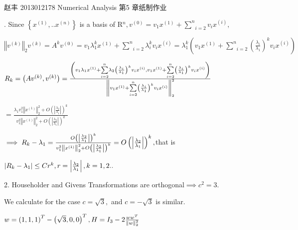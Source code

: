 \documentclass{article}
\begin{document}
\bigskip \bigskip 赵丰 2013012178 Numerical Analysis 第5 
章纸制作业

. Since $\left\{ x^{\left( 1\right) },..x^{\left( n\right)
}\right\} $ is a basis of R$^{n},v^{\left( 0\right) }=v_{1}x^{\left(
1\right) }+\underset{i=2}{\overset{n}{\sum }}v_{i}x^{\left( i\right) },$

$\left\Vert v^{\left( k\right) }\right\Vert _{2}v^{\left( k\right)
}=A^{k}v^{\left( 0\right) }=v_{1}\lambda _{1}^{k}x^{\left( 1\right) }+%
\underset{i=2}{\overset{n}{\sum }}\lambda _{i}^{k}v_{i}x^{\left( i\right)
}=\lambda _{1}^{k}\left( v_{1}x^{\left( 1\right) }+\underset{i=2}{\overset{n}%
{\sum }}\left( \frac{\lambda _{i}}{\lambda _{1}}\right) ^{k}v_{i}x^{\left(
i\right) }\right) $

$R_{k}=\left( Av^{\left( k\right) },v^{\left( k\right) }\right) =\frac{%
\left( v_{1}\lambda _{1}x^{\left( 1\right) }+\underset{i=2}{\overset{n}{\sum 
}}\lambda _{2}\left( \frac{\lambda _{i}}{\lambda _{1}}\right)
^{k}v_{i}x^{\left( i\right) },v_{1}x^{\left( 1\right) }+\underset{i=2}{%
\overset{n}{\sum }}\left( \frac{\lambda _{i}}{\lambda _{1}}\right)
^{k}v_{i}x^{\left( i\right) }\right) }{\left\Vert v_{1}x^{\left( 1\right) }+%
\underset{i=2}{\overset{n}{\sum }}\left( \frac{\lambda _{i}}{\lambda _{1}}%
\right) ^{k}v_{i}x^{\left( i\right) }\right\Vert _{2}^{2}}$

$=\frac{\lambda _{1}v_{1}^{2}\left\Vert x^{\left( 1\right) }\right\Vert
_{2}^{2}+O\left( \left\vert \frac{\lambda _{2}}{\lambda _{1}}\right\vert
\right) ^{k}}{v_{1}^{2}\left\Vert x^{\left( 1\right) }\right\Vert
_{2}^{2}+O\left( \left\vert \frac{\lambda _{2}}{\lambda _{1}}\right\vert
\right) ^{k}}$

$\implies R_{k}-\lambda _{1}=\frac{O\left( \left\vert \frac{\lambda _{2}}{%
\lambda _{1}}\right\vert \right) ^{k}}{v_{1}^{2}\left\Vert x^{\left(
1\right) }\right\Vert _{2}^{2}+O\left( \left\vert \frac{\lambda _{2}}{%
\lambda _{1}}\right\vert \right) ^{k}}=O\left( \left\vert \frac{\lambda _{2}%
}{\lambda _{1}}\right\vert \right) ^{k},$that is 

$\left\vert R_{k}-\lambda _{1}\right\vert \leq Cr^{k},r=\left\vert \frac{%
\lambda _{2}}{\lambda _{1}}\right\vert ,k=1,2..$

2. Householder and Givens Transformations are orthogonal$\implies c^{2}=3.$

We calculate for the case $c=\sqrt{3},$ and $c=-\sqrt{3}$ is similar.

$w=\left( 1,1,1\right) ^{T}-\left( \sqrt{3},0,0\right) ^{T},H=I_{3}-2\frac{%
ww^{T}}{\left\Vert w\right\Vert _{2}^{2}}$
\end{document}
